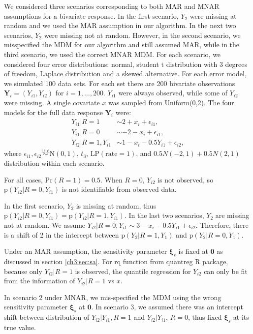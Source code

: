\documentclass[useAMS,usenatbib,referee]{biom}
\newcommand{\iid}{\stackrel{\mbox{i.i.d}}{\sim}}
\newcommand{\pr}{\mbox{p}}
\newcommand{\prob}{\mbox{Pr}}
\begin{document}
We considered three scenarios corresponding to both MAR and MNAR assumptions for a bivariate response.
In the first scenario, $Y_2$ were missing at random and we used the MAR assumption in our algorithm.
In the next two scenarios, $Y_2$ were missing not at random.
However, in the second scenario, we misspecified the MDM for our algorithm and still assumed MAR, while in the third scenario, we used the correct MNAR MDM.
For each scenario, we considered four error distributions: normal, student t distribution with 3 degrees of freedom, Laplace distribution and a skewed alternative.
For each error model, we simulated 100 data sets.
For each set there are 200 bivariate observations $\bm Y_i = (Y_{i1}, Y_{i2})$ for $i = 1, \ldots, 200$.
$Y_{i1}$ were always observed, while some of $Y_{i2}$ were missing.
A single covariate $x$ was sampled from Uniform(0,2).
The four models for the full data response $\bm Y_i$ were:
\begin{align*}
  Y_{i1} | R = 1 & \sim 2 + x_i +  \epsilon_{i1} , \\
  Y_{i1}| R = 0 & \sim  -2 - x_i +  \epsilon_{i1} , \\
  Y_{i2}| R = 1, Y_{i1}&\sim 1 - x_i - 0.5Y_{i1} + \epsilon_{i2},
\end{align*}
where $\epsilon_{i1}, \epsilon_{i2} \iid \textrm{N}(0, 1)$, $t_3$,
$\mbox{LP}(\mbox{rate} = 1)$, and $0.5 N(-2, 1) + 0.5 N(2, 1)$ distribution within each scenario.

For all cases, $\prob (R = 1) = 0.5$.
When $R = 0$, $Y_{i2}$ is not observed, so $\pr(Y_{i2}| R = 0, Y_{i1})$ is not identifiable from observed data.

In the first scenario, $Y_2$ is missing at random, thus $\pr(Y_{i2} | R = 0, Y_{i1}) = \pr(Y_{i2}|R = 1, Y_{i1}) $.
In the last two scenarios, $Y_2$ are missing not at random.
We assume $Y_{i2}| R = 0, Y_{i1} \sim 3 - x_i - 0.5Y_{i1} + \epsilon_{i2}$.
Therefore, there is a shift of 2 in the intercept between $\pr(Y_2|R = 1, Y_1)$ and $\pr(Y_2|R = 0, Y_1)$.

Under an MAR assumption, the sensitivity parameter $\bm \xi_s$ is fixed at $\bm 0$ as discussed in section \ref{ch3:sec:sa}.
For rq function from quantreg R package, because only $Y_{i2}|R = 1$ is observed, the quantile regression for $Y_{i2}$ can only be fit from the information of $Y_{i2}|R = 1$ vs $x$.

In scenario 2 under MNAR, we mis-specified the MDM using the wrong sensitivity parameter $\bm \xi_s$ at $\bm 0$.
In scenario 3, we assumed there was an intercept shift between distribution of $Y_{i2}|Y_{i1}, R = 1$ and $Y_{i2}|Y_{i1}$, $R = 0$, thus fixed $\bm \xi_s$ at its true value.
\end{document}
